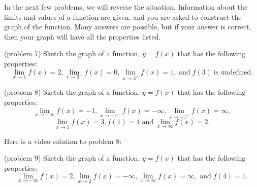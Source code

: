 \documentclass[handout]{ximera}
\begin{document}
In the next few problems, we will reverse the situation.  Information about the limits and values of a function are given, and you are asked to
construct the graph of the function.  Many answers are possible, but if your answer is correct, then your graph will have all the properties listed.



\begin{problem}(problem 7)
Sketch the graph of a function, $y = f(x)$ that has the following properties:
\[
\lim_{x \to 1} f(x) = 2, \lim_{x \to 3^-} f(x) = 0,\lim_{x \to 3^+} f(x) = 1, \; \text{and}\;  f(3) \; \text{is undefined}.
\]
\end{problem}



\begin{problem}(problem 8)
Sketch the graph of a function, $y = f(x)$ that has the following properties:
\[
\lim_{x \to -\infty} f(x) = -1, \lim_{x \to -1^-} f(x) = -\infty,\lim_{x \to -1^+} f(x) = \infty, 
\]
\[
\lim_{x \to 1} f(x) = 3, f(1) = 4\; 
\text{and}\;  \lim_{x \to \infty} f(x) = 2.
\]
\end{problem}

Here is a video solution to problem 8:

\begin{problem}(problem 9)
Sketch the graph of a function, $y = f(x)$ that has the following properties:
\[
\lim_{x \to -\infty} f(x) = 2, \lim_{x \to 2} f(x) = -\infty,\lim_{x \to \infty} f(x) = \infty, \; \text{and} \; f(4) = 1.
\]
\end{problem}
\end{document}
